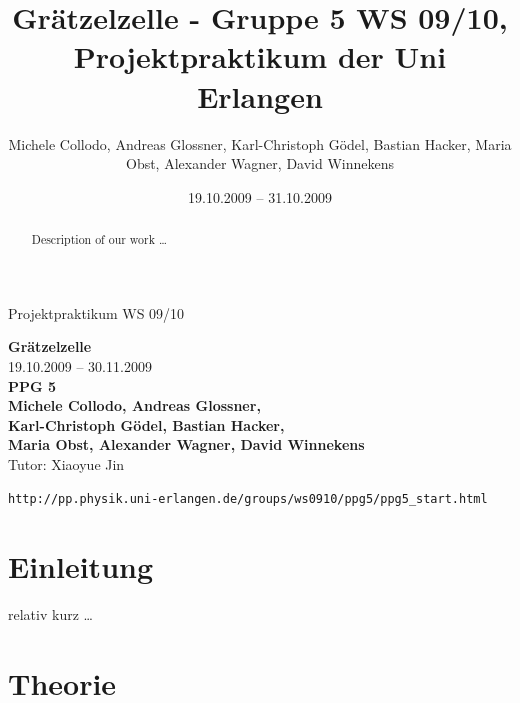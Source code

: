 \documentclass[11pt]{scrartcl}
\title{Gr\"atzelzelle - Gruppe 5 WS 09/10, Projektpraktikum der Uni Erlangen}
\date{19.10.2009 -- 31.10.2009}
\author{Michele Collodo, Andreas Glossner, Karl-Christoph Gödel, Bastian Hacker, Maria Obst, Alexander Wagner, David Winnekens}
\begin{document}
\sloppy %
\thispagestyle{empty}
\large{Projektpraktikum WS 09/10}
\hfill
{}
\\[8\baselineskip]
\begin{center}
\Huge{\textbf{Gr\"atzelzelle}}\\[0.5\baselineskip]
\Large{19.10.2009 -- 30.11.2009}
\\[6\baselineskip]
\Huge{\textbf{PPG 5}}\\[0.5\baselineskip]
\large{\textbf{Michele Collodo, Andreas Glossner,\\
Karl-Christoph Gödel, Bastian Hacker,\\
Maria Obst, Alexander Wagner, David Winnekens}\\
Tutor: Xiaoyue Jin}
\vfill



\small{\texttt{http://pp.physik.uni-erlangen.de/groups/ws0910/ppg5/ppg5\_start.html}}
\end{center}
\newpage



\tableofcontents
\vfill



\begin{abstract}

Description of our work \ldots
\end{abstract}
\newpage



\section{Einleitung}
relativ kurz \ldots
\section{Theorie}
\end{document}
